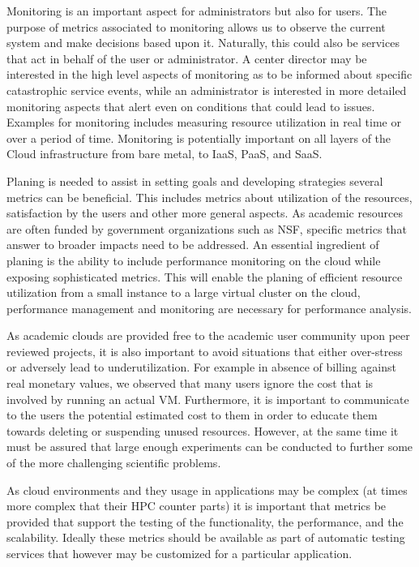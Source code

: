 \documentclass{sig-alternate-05-2015}
\begin{document}
\begin{description}
\setlength\itemsep{-2pt}

\item[\it Monitoring.] Monitoring is an important aspect for administrators but also for users. The purpose of metrics associated to monitoring allows us to observe the current system and make decisions based upon it. Naturally, this could also be services that act in behalf of the user or administrator. A center director may be interested in the high level aspects of monitoring as to be informed about specific catastrophic service events, while an administrator is interested in more detailed monitoring aspects that alert even on conditions that could lead to issues. Examples for monitoring includes measuring resource utilization in real time or over a period of time.  Monitoring is potentially important on all layers of the Cloud infrastructure from bare metal, to IaaS, PaaS, and SaaS.

\item[\it Planning.] Planing is needed to assist in setting goals and developing strategies several metrics can be beneficial. This includes metrics about utilization of the resources, satisfaction by the users and other more general aspects. As academic resources are often funded by government organizations such as NSF, specific metrics that answer to broader impacts need to be addressed. An essential ingredient of planing is the ability to include performance monitoring on the cloud while exposing sophisticated metrics.  This will enable the planing of efficient resource utilization from a small instance to a large virtual cluster on the cloud, performance management and monitoring are necessary for performance analysis.

\item[\it Billing.] As academic clouds are provided free to the academic user community upon peer reviewed projects, it is also important to avoid situations that either over-stress or adversely lead to underutilization. For example in absence of billing against real monetary values, we observed that many users ignore the cost that is involved by running an actual VM. Furthermore, it is important to communicate to the users the potential estimated cost to them in order to educate them towards deleting or suspending unused resources. However, at the same time it must be assured that large enough experiments can be conducted to further some of the more challenging scientific problems.

\item[\it Testing.] As cloud environments and they usage in applications may be complex (at times more complex that their HPC counter parts) it is important that metrics be provided that support the testing of the functionality, the performance, and the scalability. Ideally these metrics should be available as part of automatic testing services that however may be customized for a particular application.


\end{description}
\end{document}
